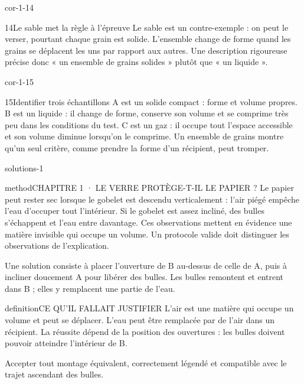\documentclass[12pt,twoside,openany]{book}
\begin{document}
\begin{blocLivre}{cor-1-14}
\begin{corrige}{14}{Le sable met la règle à l’épreuve}
Le sable est un contre-exemple : on peut le verser, pourtant chaque grain est solide. L’ensemble change de forme quand les grains se déplacent les uns par rapport aux autres. Une description rigoureuse précise donc « un ensemble de grains solides » plutôt que « un liquide ».\par
{}
\end{corrige}\end{blocLivre}
\begin{blocLivre}{cor-1-15}
\begin{corrige}{15}{Identifier trois échantillons}
A est un solide compact : forme et volume propres. B est un liquide : il change de forme, conserve son volume et se comprime très peu dans les conditions du test. C est un gaz : il occupe tout l’espace accessible et son volume diminue lorsqu’on le comprime. Un ensemble de grains montre qu’un seul critère, comme prendre la forme d’un récipient, peut tromper.\par
\end{corrige}\end{blocLivre}
\label{solutions-1}
\begin{pcFiche}{solutions-1}
\begin{pcEncadre}{method}{CHAPITRE 1 · LE VERRE PROTÈGE-T-IL LE PAPIER ?}
Le papier peut rester sec lorsque le gobelet est descendu verticalement : l’air piégé empêche l’eau d’occuper tout l’intérieur. Si le gobelet est assez incliné, des bulles s’échappent et l’eau entre davantage. Ces observations mettent en évidence une matière invisible qui occupe un volume. Un protocole valide doit distinguer les observations de l’explication.\par
\end{pcEncadre}
\label{defi-cor-1}
Une solution consiste à placer l’ouverture de B au-dessus de celle de A, puis à incliner doucement A pour libérer des bulles. Les bulles remontent et entrent dans B ; elles y remplacent une partie de l’eau.\par
{}
\begin{pcEncadre}{definition}{CE QU’IL FALLAIT JUSTIFIER}
L’air est une matière qui occupe un volume et peut se déplacer. L’eau peut être remplacée par de l’air dans un récipient. La réussite dépend de la position des ouvertures : les bulles doivent pouvoir atteindre l’intérieur de B.\par
\end{pcEncadre}
Accepter tout montage équivalent, correctement légendé et compatible avec le trajet ascendant des bulles.\par
{}
\end{pcFiche}
\end{document}
